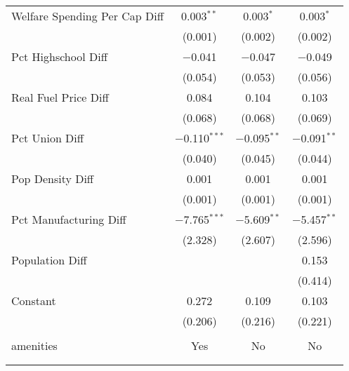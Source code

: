 \begin{table}[!htbp]
\begin{tabular}{@{\extracolsep{5pt}}lccc}
  Welfare Spending Per Cap Diff & 0.003$^{**}$ & 0.003$^{*}$ & 0.003$^{*}$ \\ 
  & (0.001) & (0.002) & (0.002) \\ 
  Pct Highschool Diff & $-$0.041 & $-$0.047 & $-$0.049 \\ 
  & (0.054) & (0.053) & (0.056) \\ 
  Real Fuel Price Diff & 0.084 & 0.104 & 0.103 \\ 
  & (0.068) & (0.068) & (0.069) \\ 
  Pct Union Diff & $-$0.110$^{***}$ & $-$0.095$^{**}$ & $-$0.091$^{**}$ \\ 
  & (0.040) & (0.045) & (0.044) \\ 
  Pop Density Diff & 0.001 & 0.001 & 0.001 \\ 
  & (0.001) & (0.001) & (0.001) \\ 
  Pct Manufacturing Diff & $-$7.765$^{***}$ & $-$5.609$^{**}$ & $-$5.457$^{**}$ \\ 
  & (2.328) & (2.607) & (2.596) \\ 
  Population Diff &  &  & 0.153 \\ 
  &  &  & (0.414) \\ 
  Constant & 0.272 & 0.109 & 0.103 \\ 
  & (0.206) & (0.216) & (0.221) \\ 
 \hline \\[-1.8ex] 
amenities & Yes & No & No \\ 
\hline \\[-1.8ex] 
\hline 
\hline \\[-1.8ex] 
\end{tabular} 
\end{table} 
